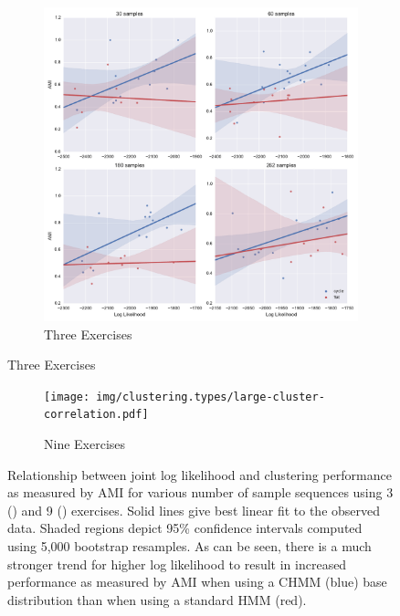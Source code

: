\documentclass[12pt]{report}
\newcommand{\1}[0]{\mathbbm{1}}
\begin{document}
\begin{figure}[H]
    \centering
    \begin{subfigure}{\textwidth}
        \includegraphics[width=\textwidth]{img/clustering.types/cluster-correlation.pdf}
        \caption{Three Exercises}
        \label{fig:cluster-correlation-3}
    \end{subfigure}
\end{figure}

\begin{figure}[H]
    \centering
    \ContinuedFloat
    \begin{subfigure}{\textwidth}
        \texttt{[image: img/clustering.types/large-cluster-correlation.pdf]}
        \caption{Nine Exercises}
        \label{fig:cluster-correlation-9}
    \end{subfigure}
    \caption[Relationship between log likelihood and AMI]{
        Relationship between joint log likelihood and clustering performance as measured
        by AMI for various number of sample sequences using 3 ()
        and 9 () exercises.
        Solid lines give best linear fit to the observed data.
        Shaded regions depict 95\% confidence intervals computed using 5,000 bootstrap resamples.
        As can be seen, there is a much stronger trend for higher
        log likelihood to result in increased performance as measured by AMI when using a
        \ac{CHMM} (blue) base distribution than when using a standard \ac{HMM} (red).
    }
    \label{fig:cluster-type-correlation}
\end{figure}
\end{document}
